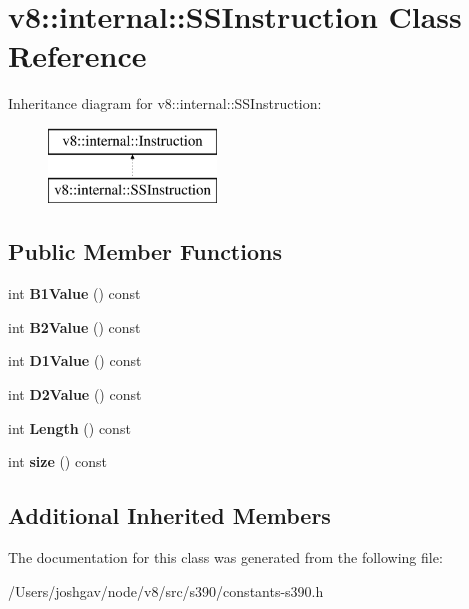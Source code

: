 \hypertarget{classv8_1_1internal_1_1_s_s_instruction}{}\section{v8\+:\+:internal\+:\+:S\+S\+Instruction Class Reference}
\label{classv8_1_1internal_1_1_s_s_instruction}
Inheritance diagram for v8\+:\+:internal\+:\+:S\+S\+Instruction\+:\begin{figure}[H]
\begin{center}
\leavevmode
\includegraphics[height=2.000000cm]{classv8_1_1internal_1_1_s_s_instruction}
\end{center}
\end{figure}
\subsection*{Public Member Functions}
\begin{DoxyCompactItemize}
\item 
int {\bfseries B1\+Value} () const \hypertarget{classv8_1_1internal_1_1_s_s_instruction_a667cbe5a47af94a9283835854593febc}{}\label{classv8_1_1internal_1_1_s_s_instruction_a667cbe5a47af94a9283835854593febc}

\item 
int {\bfseries B2\+Value} () const \hypertarget{classv8_1_1internal_1_1_s_s_instruction_a0129bb3a3f1e4336785be9457a0f0b98}{}\label{classv8_1_1internal_1_1_s_s_instruction_a0129bb3a3f1e4336785be9457a0f0b98}

\item 
int {\bfseries D1\+Value} () const \hypertarget{classv8_1_1internal_1_1_s_s_instruction_a1c0576bc89feee721633e48600ee95de}{}\label{classv8_1_1internal_1_1_s_s_instruction_a1c0576bc89feee721633e48600ee95de}

\item 
int {\bfseries D2\+Value} () const \hypertarget{classv8_1_1internal_1_1_s_s_instruction_aefa38a9553781ed282af39dd0a1ffae0}{}\label{classv8_1_1internal_1_1_s_s_instruction_aefa38a9553781ed282af39dd0a1ffae0}

\item 
int {\bfseries Length} () const \hypertarget{classv8_1_1internal_1_1_s_s_instruction_a7ce29dd30d50d2bc6694aef2dbeb6a6a}{}\label{classv8_1_1internal_1_1_s_s_instruction_a7ce29dd30d50d2bc6694aef2dbeb6a6a}

\item 
int {\bfseries size} () const \hypertarget{classv8_1_1internal_1_1_s_s_instruction_a22732ef276c724783eb857e4588d38bb}{}\label{classv8_1_1internal_1_1_s_s_instruction_a22732ef276c724783eb857e4588d38bb}

\end{DoxyCompactItemize}
\subsection*{Additional Inherited Members}


The documentation for this class was generated from the following file\+:\begin{DoxyCompactItemize}
\item 
/\+Users/joshgav/node/v8/src/s390/constants-\/s390.\+h\end{DoxyCompactItemize}

